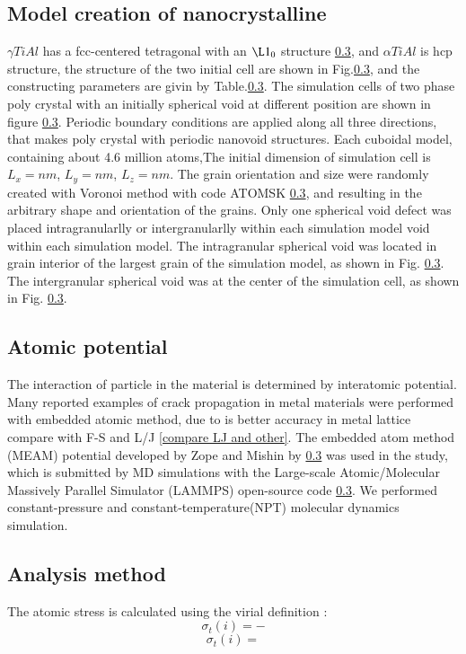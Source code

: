 \documentclass[final,5p,times,twocolumn]{elsarticle}
\begin{document}
\subsection{Model creation of nanocrystalline}
$\gamma  TiAl$ has a fcc-centered tetragonal with an $\L1_0$ structure \ref{}, and $\alpha TiAl$ is hcp structure, the structure of the two initial cell are shown in Fig.\ref{}, and the constructing parameters are givin by Table.\ref{}. The simulation cells of two phase poly crystal with an initially spherical void at different position are shown in figure \ref{}. Periodic boundary conditions are applied along all three directions, that makes poly crystal with periodic nanovoid structures. Each cuboidal model, containing about 4.6 million atoms,The initial dimension of simulation cell is  $L_x = nm$, $L_y =  nm$, $L_z =  nm$. The grain orientation and size were randomly created with Voronoi method with code ATOMSK \ref{}, and resulting in the arbitrary shape and orientation of the grains. Only one spherical void defect was placed intragranularlly or intergranularlly within each simulation model void within each simulation model. The intragranular spherical void was located in grain interior of the largest grain of the simulation model, as shown in Fig. \ref{}. The intergranular spherical void was at the center of the simulation cell, as shown in Fig. \ref{}.

\subsection{Atomic potential}
The interaction of particle in the material is determined by interatomic potential. Many reported examples of crack propagation in metal materials were performed with embedded atomic method, due to is better accuracy in metal lattice compare with F-S and L/J \ref{compare LJ and other}. The embedded atom method (MEAM) potential developed by Zope and Mishin by \ref{} was used in the study, which is submitted by MD simulations with the Large-scale Atomic/Molecular Massively Parallel Simulator (LAMMPS) open-source code \ref{}. We performed constant-pressure and constant-temperature(NPT) molecular dynamics simulation.

\subsection{Analysis method}
The atomic stress is calculated using the virial definition :
$$\sigma_t(i)=-$$
$$\sigma_t(i)= $$
\end{document}
